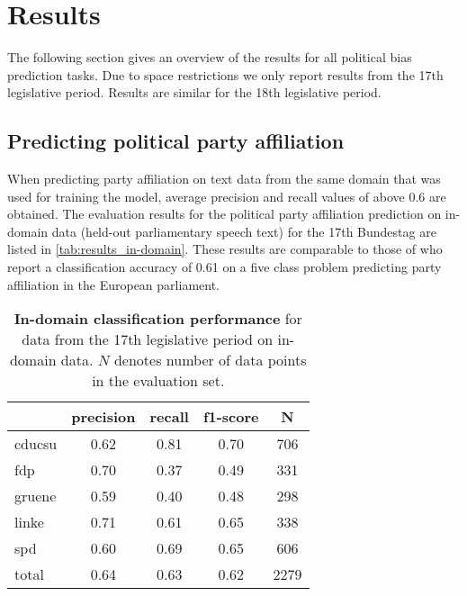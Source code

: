 \documentclass[11pt]{article}
\begin{document}
\section{Results}\label{sec:results}

The following section gives an overview of the results for all political bias prediction tasks. 
Due to space restrictions we only report results from the 17th legislative period. Results are similar for the 18th legislative period.

\subsection{Predicting political party affiliation}
When predicting party affiliation on text data from the same domain that was used for training the model, average precision and recall values of above 0.6 are obtained. The evaluation results for the political party affiliation prediction on in-domain data (held-out parliamentary speech text) for the 17th Bundestag are listed in \autoref{tab:results_in-domain}.
These results are comparable to those of \cite{Hirst2014} who report a classification accuracy of 0.61 on a five class problem predicting party affiliation in the European parliament.


\begin{table}[t]
\caption{
\label{tab:results_in-domain}
{\bf In-domain classification performance} for data from the 17th legislative period on in-domain data. $N$ denotes number of data points in the evaluation set.
}
\begin{center}
\begin{tabular}{lcccc}
    &         precision    &recall &  f1-score  & N  \\
\hline \hline
       cducsu   &    0.62  &    0.81  &    0.70  &     706\\
        fdp    &   0.70   &   0.37  &    0.49    &   331\\
     gruene &      0.59  &    0.40   &   0.48   &    298\\
      linke    &   0.71   &   0.61  &    0.65    &   338\\
        spd   &    0.60   &   0.69  &    0.65   &    606\\
\hline
 total &      0.64   &   0.63   &   0.62    &  2279 
%
\end{tabular}
\end{center}
\end{table}
\end{document}
